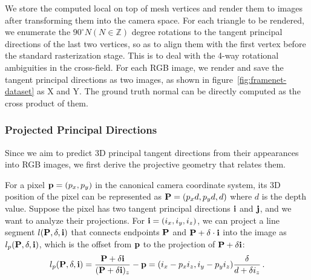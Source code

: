 We store the computed local \cframe{} on top of mesh vertices and render them to images after transforming them into the camera space. For each triangle to be rendered, we enumerate the $90^{\circ}N (N\in \mathbb{Z})$ degree rotations to the tangent principal directions of the last two vertices, so as to align them with the first vertex before the standard rasterization stage. This is to deal with the 4-way rotational ambiguities in the cross-field. For each RGB image, we render and save the tangent principal directions as two images, as shown in figure~\ref{fig:framenet-dataset} as X and Y. The ground truth normal can be directly computed as the cross product of them.

\subsubsection{Projected Principal Directions}
\label{sec:framenet-project}
Since we aim to predict 3D principal tangent directions from their appearances into RGB images, we first derive the projective geometry that relates them.


 For a pixel $\mathbf{p}=(p_x,p_y)$ in the canonical camera coordinate system, its 3D position of the pixel can be represented as $\mathbf{P}=(p_xd, p_yd, d)$ where $d$ is the depth value. Suppose the pixel has two tangent principal directions $\mathbf{i}$ and $\mathbf{j}$, and we want to analyze their projections. For $\mathbf{i}=(i_x,i_y,i_z)$, we can project a line segment $l(\mathbf{P},\delta,\mathbf{i})$ that connects endpoints $\mathbf{P}$ and $\mathbf{P}+\delta \cdot \mathbf{i}$ into the image as $l_p(\textbf{P},\delta,\mathbf{i})$, which is the offset from $\mathbf{p}$ to the projection of $\mathbf{P}+\delta \mathbf{i}$:
\begin{equation}
    l_p(\textbf{P},\delta,\textbf{i}) = \frac{\textbf{P}+\delta \textbf{i}}{(\textbf{P}+\delta \textbf{i})_z}-\mathbf{p}=(i_x - p_x i_z, i_y - p_y i_z)\frac{\delta}{d+\delta i_z}\,.
\end{equation}

